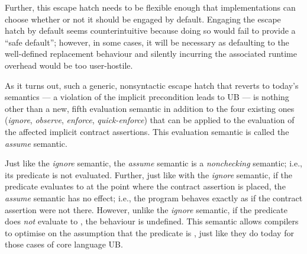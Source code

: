 {Further, this escape hatch needs to be flexible enough that implementations can choose whether or not it should be engaged by default. Engaging the escape hatch by default seems counterintuitive because doing so would fail to provide a ``safe default''; however, in some cases, it will be necessary as defaulting to the well-defined replacement behaviour and silently incurring the associated runtime overhead would be too user-hostile.

As it turns out, such a generic, nonsyntactic escape hatch that reverts to today's semantics --- a violation of the implicit precondition leads to UB --- is nothing other than a new, fifth evaluation semantic in addition to the four existing ones (\emph{ignore}, \emph{observe}, \emph{enforce}, \emph{quick-enforce}) that can be applied to the evaluation of the affected implicit contract assertions. This evaluation semantic is called the \emph{assume} semantic.

Just like the \emph{ignore} semantic, the \emph{assume} semantic is a \emph{nonchecking} semantic; i.e., its predicate is not evaluated. Further, just like with the \emph{ignore} semantic, if the predicate evaluates to  at the point where the contract assertion is placed, the \emph{assume} semantic has no effect; i.e., the program behaves exactly as if the contract assertion were not there. However, unlike the \emph{ignore} semantic, if the predicate does \emph{not} evaluate to , the behaviour is undefined. This semantic allows compilers to optimise on the assumption that the predicate is , just like they do today for those cases of core language UB.

}
